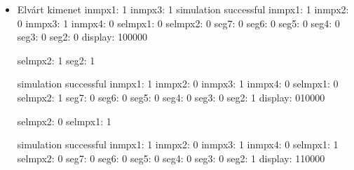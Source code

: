 \begin{itemize}
\item Elvárt kimenet\newline
inmpx1: 1\newline
inmpx3: 1\newline
simulation successful
inmpx1: 1\newline
inmpx2: 0\newline
inmpx3: 1\newline
inmpx4: 0\newline
selmpx1: 0\newline
selmpx2: 0\newline
seg7: 0\newline
seg6: 0\newline
seg5: 0\newline
seg4: 0\newline
seg3: 0\newline
seg2: 0\newline
display: 100000\newline

selmpx2: 1\newline
seg2: 1\newline

simulation successful\newline
inmpx1: 1\newline
inmpx2: 0\newline
inmpx3: 1\newline
inmpx4: 0\newline
selmpx1: 0\newline
selmpx2: 1\newline
seg7: 0\newline
seg6: 0\newline
seg5: 0\newline
seg4: 0\newline
seg3: 0\newline
seg2: 1\newline
display: 010000\newline

selmpx2: 0\newline
selmpx1: 1\newline

simulation successful\newline
inmpx1: 1\newline
inmpx2: 0\newline
inmpx3: 1\newline
inmpx4: 0\newline
selmpx1: 1\newline
selmpx2: 0\newline
seg7: 0\newline
seg6: 0\newline
seg5: 0\newline
seg4: 0\newline
seg3: 0\newline
seg2: 1\newline
display: 110000\newline



\end{itemize}

